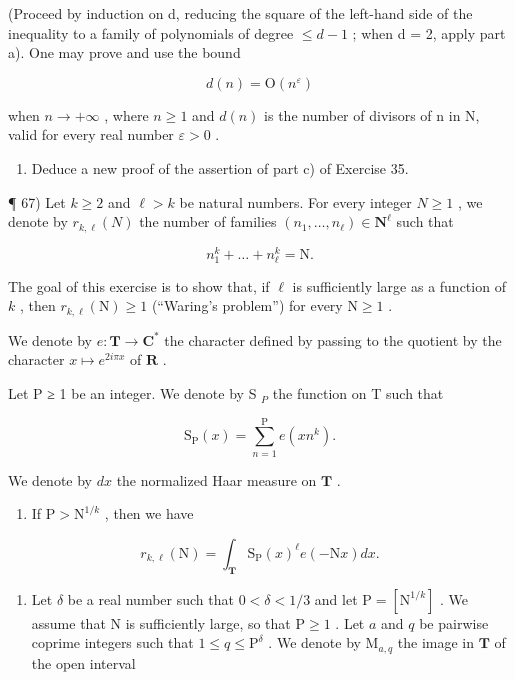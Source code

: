 (Proceed by induction on d, reducing the square of the left-hand side of the inequality to a family of polynomials of degree \(\leqslant d - 1\) ; when d = 2, apply part a). One may prove and use the bound

\[
d (n) = \mathrm{O} (n ^ {\varepsilon})
\]

when \(n \to +\infty\) , where \(n \geqslant 1\) and \(d(n)\) is the number of divisors of n in N, valid for every real number \(\varepsilon > 0\) .

\begin{enumerate}
\def\labelenumi{\alph{enumi})}
\setcounter{enumi}{2}
\tightlist
\item
  Deduce a new proof of the assertion of part c) of Exercise 35.
\end{enumerate}

¶ 67) Let \(k \geqslant 2\) and \(\ell > k\) be natural numbers. For every integer \(N \geqslant 1\) , we denote by \(r_{k,\ell}(N)\) the number of families \((n_1, \ldots, n_\ell) \in \mathbf{N}^\ell\) such that

\[
n _ {1} ^ {k} + \dots + n _ {\ell} ^ {k} = \mathrm{N}.
\]

The goal of this exercise is to show that, if \(\ell\) is sufficiently large as a function of \(k\) , then \(r_{k,\ell}(\mathrm{N}) \geqslant 1\) (“Waring's problem”) for every \(\mathrm{N} \geqslant 1\) .

We denote by \(e\colon\mathbf{T}\to\mathbf{C}^{*}\) the character defined by passing to the quotient by the character \(x\mapsto e^{2i\pi x}\) of \(\mathbf{R}\) .

Let P ≥ 1 be an integer. We denote by S \(_{P}\) the function on T such that

\[
\mathrm{S} _ {\mathrm{P}} (x) = \sum_ {n = 1} ^ {\mathrm{P}} e (x n ^ {k}).
\]

We denote by \(dx\) the normalized Haar measure on \(\mathbf{T}\) .

\begin{enumerate}
\def\labelenumi{\alph{enumi})}
\tightlist
\item
  If \(\mathrm{P} > \mathrm{N}^{1 / k}\) , then we have
\end{enumerate}

\[
r _ {k, \ell} (\mathrm{N}) = \int_ {\mathbf {T}} \mathrm{S} _ {\mathrm{P}} (x) ^ {\ell} e (- \mathrm{N} x) d x.
\]

\begin{enumerate}
\def\labelenumi{\alph{enumi})}
\setcounter{enumi}{1}
\tightlist
\item
  Let \(\delta\) be a real number such that \(0 < \delta < 1/3\) and let \(\mathrm{P} = [\mathrm{N}^{1/k}]\) . We assume that N is sufficiently large, so that \(\mathrm{P} \geqslant 1\) . Let \(a\) and \(q\) be pairwise coprime integers such that \(1 \leqslant q \leqslant \mathrm{P}^{\delta}\) . We denote by \(\mathrm{M}_{a,q}\) the image in \(\mathbf{T}\) of the open interval
\end{enumerate}

